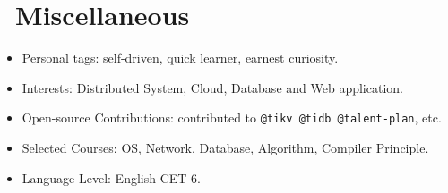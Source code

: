 \documentclass{resume}
\newcommand{\en}[1]{#1}
\newcommand{\zh}[1]{}
\begin{document}
\section{\faInfo\ \en{Miscellaneous}\zh{杂项}}
\begin{itemize}[parsep=0.25ex]
      \item \en{Personal tags: self-driven, quick learner, earnest curiosity.}
            \zh{个人标签：自驱动，学习能力强，做事认真，保持好奇}
      \item \en{Interests: Distributed System, Cloud, Database and Web application.}
            \zh{兴趣领域：分布式系统、云、数据库、Web 应用等}
      \item \en{Open-source Contributions: contributed to \texttt{@tikv @tidb @talent-plan}, etc.}
            \zh{开源贡献: 为 \texttt{@tikv @tidb @talent-plan} 等项目组织贡献过代码}
      \item \en{Selected Courses: OS, Network, Database, Algorithm, Compiler Principle.}
            \zh{主修课程：操作系统、计算机网络、数据库系统原理、算法设计与分析、编译原理}
      \item \en{Language Level: English CET-6.}
            \zh{语言水平：英语 CET-6}
\end{itemize}
\end{document}
